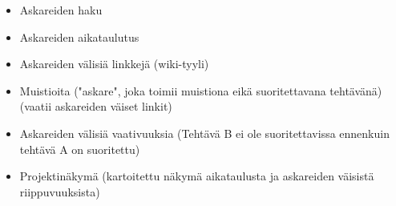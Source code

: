 ﻿\documentclass[finnish]{article}
\begin{document}
\begin{itemize}
  \item Askareiden haku
  \item Askareiden aikataulutus
  \item Askareiden välisiä linkkejä (wiki-tyyli)
  \item Muistioita ("askare", joka toimii muistiona eikä suoritettavana tehtävänä) (vaatii askareiden väiset linkit)
  \item Askareiden välisiä vaativuuksia (Tehtävä B ei ole suoritettavissa ennenkuin tehtävä A on suoritettu)
  \item Projektinäkymä (kartoitettu näkymä aikataulusta ja askareiden väisistä riippuvuuksista)
\end{itemize}
\end{document}
